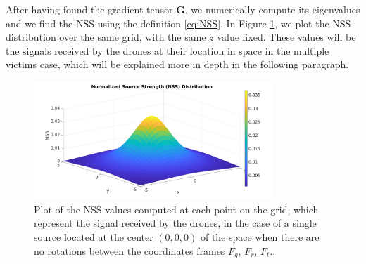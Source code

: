 After having found the gradient tensor $\mathbf{G}$, we numerically
compute its eigenvalues and we find the NSS using the definition \ref{eq:NSS}.
In Figure \ref{fig:NSS_single_anal}, we plot the NSS distribution over the same grid,
with the same $z$ value fixed.
These values will be the signals received by the drones at their location
in space in the multiple victims case, which will be explained more in depth in the following paragraph.
\begin{figure}
\centering
\includegraphics[width=0.8\textwidth]{images/NSS_single_anal.jpg}
\caption{Plot of the NSS values computed at each point on the grid, which
represent the signal received by the drones, in the case of a single source located
at the center $(0,0,0)$ of the space when there are no rotations between the coordinates
frames $F_g$, $F_r$, $F_t$..}
\label{fig:NSS_single_anal}
\end{figure}

